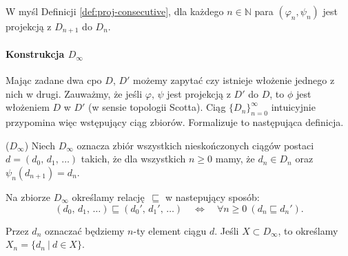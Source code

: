 W myśl Definicji \ref{def:proj-consecutive}, dla każdego \(n\in \mathbb{N}\) para \((\varphi_n, \psi_n)\) jest projekcją z \(D_{n+1}\) do \(D_n\).


\paragraph{Konstrukcja \(D_\infty\)}

Mając zadane dwa cpo \(D\), \(D'\) możemy zapytać czy istnieje włożenie jednego z nich w drugi. Zauważmy, że jeśli \(\varphi,\,\psi\) jest projekcją z \(D'\) do \(D\), to \(\phi\) jest włożeniem \(D\) w \(D'\) (w sensie topologii Scotta). Ciąg \(\{D_n\}_{n=0}^\infty\) intuicyjnie przypomina więc wstępujący ciąg zbiorów. Formalizuje to następująca definicja.


\begin{definicja}(\(D_\infty\)) %
Niech \(D_\infty\) oznacza zbiór wszystkich nieskończonych ciągów postaci
\( d=(d_0,\,d_1,\,\dots) \)
  takich, że dla wszystkich \(n\geq 0\) mamy, że \(d_n\in D_n\) oraz \({\psi_n (d_{n+1}) = d_n}\). 

Na zbiorze \(D_\infty\) określamy relację \(\sqsubseteq\) w nastepujący sposób:
\[
(d_0,\,d_1,\,\dots) \sqsubseteq (d_0',\,d_1',\,\dots) \quad \iff\quad  \forall n\geq 0\  (d_n\sqsubseteq d_n').
\]

  Przez \(d_n\) oznaczać będziemy \(n\)-ty element ciągu \(d\). Jeśli \(X\subset D_\infty\), to określamy \(X_n=\{ d_n\ |\ d\in X\}\).

\end{definicja}

